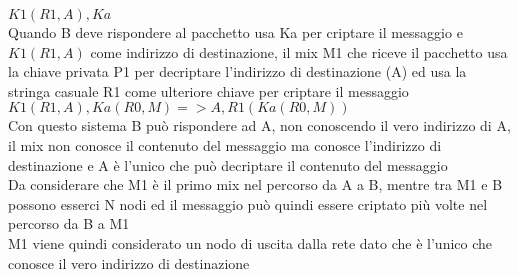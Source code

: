$K1(R1, A), Ka$ \\
Quando B deve rispondere al pacchetto usa Ka per criptare il messaggio e $K1(R1, A)$ come indirizzo di destinazione, il mix M1 che riceve il pacchetto usa la chiave privata P1 per decriptare l'indirizzo di destinazione (A) ed usa la stringa casuale R1 come ulteriore chiave per criptare il messaggio \\
$K1( R1, A ), Ka( R0, M ) => A, R1( Ka( R0, M ) )$ \\
Con questo sistema B può rispondere ad A, non conoscendo il vero indirizzo di A, il mix non conosce il contenuto del messaggio ma conosce l'indirizzo di destinazione e A è l'unico che può decriptare il contenuto del messaggio \\
Da considerare che M1 è il primo mix nel percorso da A a B, mentre tra M1 e B possono esserci N nodi ed il messaggio può quindi essere criptato più volte nel percorso da B a M1 \\
M1 viene quindi considerato un nodo di uscita dalla rete dato che è l'unico che conosce il vero indirizzo di destinazione 

\cite{ChaumMixes}